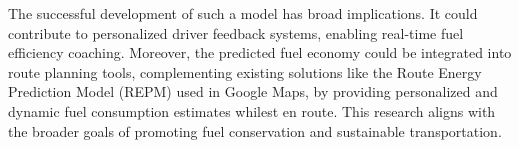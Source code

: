 \documentclass[letterpaper]{article}
\begin{document}
The successful development of such a model has broad implications. 
It could contribute to personalized driver feedback systems, 
enabling real-time fuel efficiency coaching. 
Moreover, the predicted fuel economy could be integrated into route planning tools, 
complementing existing solutions like the Route Energy Prediction Model (REPM) used in Google Maps, 
by providing personalized and dynamic fuel consumption estimates whilest en route. 
This research aligns with the broader goals of promoting fuel conservation and sustainable transportation.

 

\end{document}
